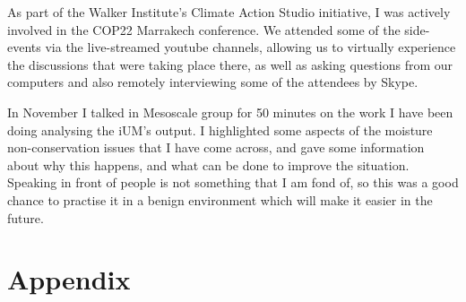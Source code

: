 \documentclass[11pt,a4paper]{article}
\newcommand{\todo}{TODO: \texttt}
\begin{document}
As part of the Walker Institute's Climate Action Studio initiative, I was actively involved in the COP22 Marrakech conference.  We attended some of the side-events via the live-streamed youtube channels, allowing us to virtually experience the discussions that were taking place there, as well as asking questions from our computers and also remotely interviewing some of the attendees by Skype. %

In November I talked in Mesoscale group for 50 minutes on the work I have been doing analysing the iUM's output. I highlighted some aspects of the moisture non-conservation issues that I have come across, and gave some information about why this happens, and what can be done to improve the situation. %
Speaking in front of people is not something that I am fond of, so this was a good chance to practise it in a benign environment which will make it easier in the future.

\printbibliography[title={References}]

\newpage
\section*{Appendix}
\end{document}
